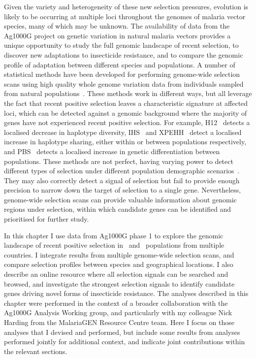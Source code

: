 \documentclass[a4paper,11pt,abstracton,hidelinks]{scrartcl}
\begin{document}
Given the variety and heterogeneity of these new selection pressures, evolution is likely to be occurring at multiple loci throughout the genomes of malaria vector species, many of which may be unknown.
%
The availability of data from the Ag1000G project on genetic variation in natural malaria vectors provides a unique opportunity to study the full genomic landscape of recent selection, to discover new adaptations to insecticide resistance, and to compare the genomic profile of adaptation between different species and populations.
%
A number of statistical methods have been developed for performing genome-wide selection scans using high quality whole genome variation data from individuals sampled from natural populations~\parencite{Oleksyk2010,Haasl2016,Vatsiou2016,Pavlidis2017,Booker2017}.
%
These methods work in different ways, but all leverage the fact that recent positive selection leaves a characteristic signature at affected loci, which can be detected against a genomic background where the majority of genes have not experienced recent positive selection.
%
For example, H12~\parencite{Garud2015} detects a localised decrease in haplotype diversity, IHS~\parencite{Voight2006} and XPEHH~\parencite{Sabeti2007} detect a localised increase in haplotype sharing, either within or between populations respectively, and PBS~\parencite{Yi2010,Crawford2017} detects a localised increase in genetic differentiation between populations.
%
These methods are not perfect, having varying power to detect different types of selection under different population demographic scenarios~\parencite{Haasl2016,Vatsiou2016,Pavlidis2017,Booker2017}.
%
They may also correctly detect a signal of selection but fail to provide enough precision to narrow down the target of selection to a single gene.
%
Nevertheless, genome-wide selection scans can provide valuable information about genomic regions under selection, within which candidate genes can be identified and prioritised for further study.


In this chapter I use data from Ag1000G phase 1 to explore the genomic landscape of recent positive selection in \agam\ and \acol\ populations from multiple countries.
%
I integrate results from multiple genome-wide selection scans, and compare selection profiles between species and geographical locations.
%
I also describe an online resource where all selection signals can be searched and browsed, and investigate the strongest selection signals to identify candidate genes driving novel forms of insecticide resistance.
%
The analyses described in this chapter were performed in the context of a broader collaboration with the Ag1000G Analysis Working group, and particularly with my colleague Nick Harding from the MalariaGEN Resource Centre team.
%
Here I focus on those analyses that I devised and performed, but include some results from analyses performed jointly for additional context, and indicate joint contributions within the relevant sections.
%
\end{document}
